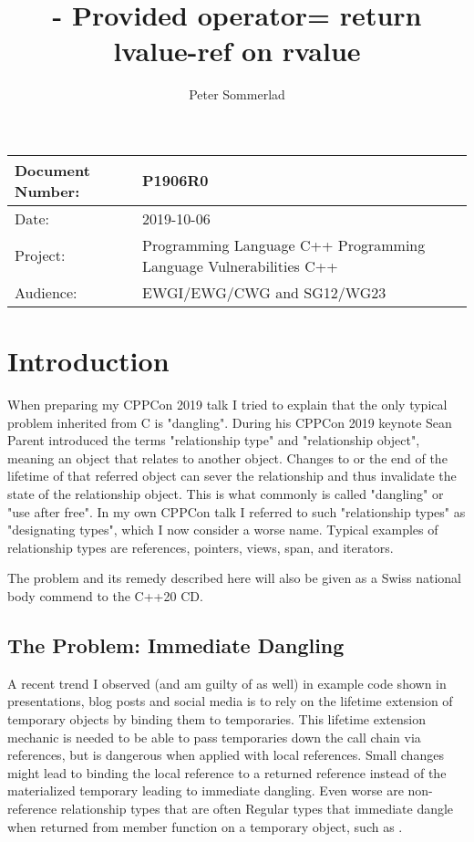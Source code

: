 \documentclass[ebook,11pt,article]{memoir}
\title{\papernumber{} - Provided operator= return lvalue-ref on rvalue}
\author{Peter Sommerlad}
\date{\paperdate}                %
\newcommand{\papernumber}{P1906R0}
\newcommand{\paperdate}{2019-10-06}
\begin{document}
\maketitle
\begin{center}
\begin{tabular}[t]{|l|p{8cm}|}\hline 
Document Number:&  \papernumber \\\hline
Date: & \paperdate \\\hline
Project: & Programming Language C++ \newline Programming Language Vulnerabilities C++\\\hline 
Audience: & EWGI/EWG/CWG and SG12/WG23\\\hline
\end{tabular}
\end{center}


\chapter{Introduction}

When preparing my CPPCon 2019 talk I tried to explain that the only typical problem inherited from C is "dangling".
During his CPPCon 2019 keynote Sean Parent introduced the terms "relationship type" and "relationship object", meaning an object that relates to another object. Changes to or the end of the lifetime of that referred object can sever the relationship and thus invalidate the state of the relationship object.
This is what commonly is called "dangling" or "use after free". In my own CPPCon talk I referred to such "relationship types" as "designating types", which I now consider a worse name.
Typical examples of relationship types are references, pointers, views, span, and iterators.

The problem and its remedy described here will also be given as a Swiss national body commend to the C++20 CD.

\section{The Problem: Immediate Dangling}

A recent trend I observed (and am guilty of as well) in example code shown in presentations, blog posts and social media is to rely on the lifetime extension of temporary objects by binding them to temporaries.
This lifetime extension mechanic is needed to be able to pass temporaries down the call chain via references, but is dangerous when applied with local references.
Small changes might lead to binding the local reference to a returned reference instead of the materialized temporary leading to immediate dangling.
Even worse are non-reference relationship types that are often Regular types that immediate dangle when returned from member function on a temporary object, such as .
\end{document}
